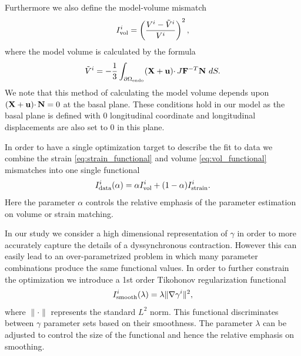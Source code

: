 Furthermore we also define the model-volume mismatch
\begin{equation}
  I_{\text{vol}}^i  =  \left( \frac{V^i - \tilde{V}^i}{V^i} \right)^2,
\end{equation}
where the model volume is calculated by the formula
\begin{equation}
  \tilde{V}^i = -\frac{1}{3} \int_{\partial \Omega_{ \textnormal{\tiny \text{endo}}}} (\mathbf{X} + \mathbf{u}) \cdotp J \mathbf{F}^{-T} \mathbf{N}  \ dS.
  \label{eq:vol_functional}
 \end{equation}
We note that this method of calculating the model volume depends upon
$(\mathbf{X} + \mathbf{u})\cdotp \mathbf{N} = 0$ at the basal plane. These conditions hold in 
our model as the basal plane is defined with 0 longitudinal coordinate and 
longitudinal displacements are also set to 0 in this plane.

In order to have a single optimization target to describe the fit to data 
we combine the strain \eqref{eq:strain_functional} and volume
\eqref{eq:vol_functional} mismatches into one single functional
\begin{equation}
  I_{\text{data}}^i(\alpha) = \alpha I_{\text{vol}}^i + (1 - \alpha) I_{\text{strain}}^i.
\label{eq:total_functional}
\end{equation}
Here the parameter $\alpha$ controls the relative emphasis of the parameter
estimation on volume or strain matching.

In our study we consider a high dimensional representation of $\gamma$ in order
to more accurately capture the details of a dyssynchronous contraction. However this can easily lead to
an over-parametrized problem in which many parameter combinations produce the same
functional values. In order to further constrain the optimization we introduce
a 1st order Tikohonov regularization functional
\begin{equation}
 I_{\text{smooth}}^i(\lambda) = \lambda \| \nabla \gamma^i \|^2, 
 \label{eq:I_smooth}
\end{equation}
where $\|\cdotp \|$ represents the standard $L^2$ norm.
This functional discriminates between $\gamma$ parameter sets based on their smoothness.
The parameter $\lambda$ can be adjusted to control the size of the functional and hence
the relative emphasis on smoothing.

